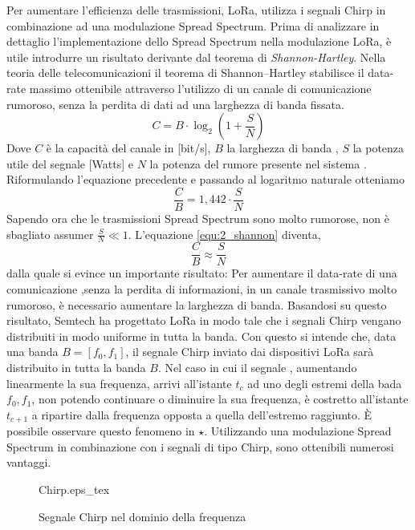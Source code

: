 Per aumentare l'efficienza delle trasmissioni, LoRa, utilizza i segnali Chirp in
combinazione ad una modulazione Spread Spectrum. 
Prima di analizzare in dettaglio l'implementazione dello Spread Spectrum 
nella modulazione LoRa, è utile introdurre un risultato derivante dal teorema di
\textit{Shannon-Hartley}.
Nella teoria delle telecomunicazioni il teorema di Shannon–Hartley stabilisce il
data-rate massimo ottenibile attraverso l'utilizzo di un canale di comunicazione 
rumoroso, senza la perdita di dati ad una larghezza di banda fissata.
\begin{equation}
        C = B\cdot \log_2\left(1+\frac{S}{N}\right)
\end{equation}
Dove $C$ è la capacità del canale in [bit/s], $B$ la larghezza di banda , $S$ la
potenza utile del segnale  [Watts] e $N$ la potenza del rumore presente nel
sistema .
Riformulando l'equazione precedente e passando al logaritmo naturale otteniamo
\begin{equation}\label{equ:2_shannon}
        \frac{C}{B} = 1,442 \cdot \frac{S}{N}
\end{equation}
Sapendo ora che le trasmissioni Spread Spectrum sono molto rumorose, non è
sbagliato assumer $\frac{S}{N} \ll 1$. L'equazione \ref{equ:2_shannon}
diventa,
\begin{equation}
        \frac{C}{B} \approx \frac{S}{N}
\end{equation}
dalla quale si evince un importante risultato: Per aumentare il data-rate di una
comunicazione ,senza la perdita di informazioni, in un canale trasmissivo molto
rumoroso, è necessario aumentare la larghezza di banda. Basandosi su questo
risultato, Semtech ha progettato LoRa in modo tale che i segnali Chirp vengano
distribuiti in modo uniforme in tutta la banda. 
Con questo si intende che, data una banda $B =
[f_0,f_1]$, il segnale Chirp inviato dai dispositivi LoRa sarà distribuito in tutta la banda
$B$. Nel caso in cui il segnale ,  aumentando linearmente la sua frequenza,
arrivi all'istante $t_c$ ad uno degli estremi della bada $f_0,f_1$, non potendo
continuare o diminuire la sua frequenza,
 è costretto all'istante $t_{c+1}$ a ripartire dalla frequenza opposta a quella
dell'estremo raggiunto. È possibile osservare questo fenomeno in
\hyperlink{label_in_fig_1}{$\star$}.
Utilizzando una modulazione Spread Spectrum in combinazione con i segnali di tipo
Chirp, sono ottenibili numerosi vantaggi.
\begin{figure}[h]
        \centering
                {Chirp.eps_tex}
        \caption{Segnale Chirp nel dominio della frequenza}
\end{figure}
